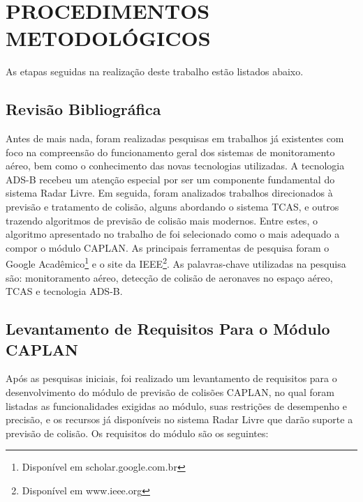 \section{PROCEDIMENTOS METODOLÓGICOS}

As etapas seguidas na realização deste trabalho estão listados abaixo.

\subsection{Revisão Bibliográfica}

Antes de mais nada, foram realizadas pesquisas em trabalhos já existentes com foco na compreensão do funcionamento geral dos sistemas de monitoramento aéreo, bem como o conhecimento das novas tecnologias utilizadas. A tecnologia ADS-B recebeu um atenção especial por ser um componente fundamental do sistema Radar Livre. Em seguida, foram analizados trabalhos direcionados à previsão e tratamento de colisão, alguns abordando o sistema TCAS, e outros trazendo algoritmos de previsão de colisão mais modernos. Entre estes, o algoritmo apresentado no trabalho de  foi selecionado como o mais adequado a compor o módulo CAPLAN. As principais ferramentas de pesquisa foram o Google Acadêmico\footnote{Disponível em scholar.google.com.br} e o site da IEEE\footnote{Disponível em www.ieee.org}. As palavras-chave utilizadas na pesquisa são: monitoramento aéreo, detecção de colisão de aeronaves no espaço aéreo, TCAS e tecnologia ADS-B.

\subsection{Levantamento de Requisitos Para o Módulo CAPLAN}

Após as pesquisas iniciais, foi realizado um levantamento de requisitos para o desenvolvimento do módulo de previsão de colisões CAPLAN, no qual foram listadas as funcionalidades exigidas ao módulo, suas restrições de desempenho e precisão, e os recursos já disponíveis no sistema Radar Livre que darão suporte a previsão de colisão. Os requisitos do módulo são os seguintes:

